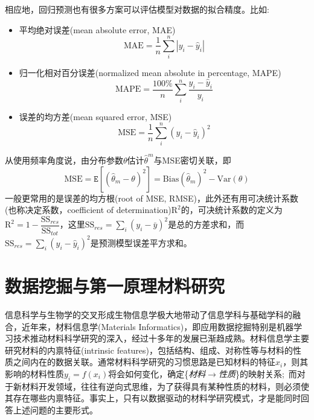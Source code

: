 相应地，回归预测也有很多方案可以评估模型对数据的拟合精度。比如:
\begin{itemize}
	\item 平均绝对误差\textrm{(mean absolute error, MAE)}
		\begin{displaymath}
			\mathrm{MAE}=\dfrac1n\sum_i^n|y_i-\hat{y}_i|
		\end{displaymath}
	\item 归一化相对百分误差\textrm{(normalized mean absolute in percentage, MAPE)}
		\begin{displaymath}
			\mathrm{MAPE}=\dfrac{100\%}n\sum_i^n\dfrac{y_i-\hat{y}_i}{y_i}
		\end{displaymath}
	\item 误差的均方差\textrm{(mean squared error, MSE)}
		\begin{displaymath}
			\mathrm{MSE}=\dfrac1n\sum_i^n(y_i-\hat{y}_i)^2
		\end{displaymath} 
\end{itemize}
从使用频率角度说，由分布参数$\theta$估计$\hat{\theta}^m$与\textrm{MSE}密切关联，即
		\begin{displaymath}
			\mathrm{MSE}=\mathtt{E}[(\hat{\theta}_m-\theta)^2]=\mathrm{Bias}(\hat{\theta}_m)^2-\mathrm{Var}(\theta)
		\end{displaymath} 
		一般更常用的是误差的均方根\textrm{(root of MSE, RMSE)}，此外还有用可决统计系数(也称决定系数，\textrm{coefficient of determination})$\mathrm{R}^2$的，可决统计系数的定义为$\mathrm{R}^2=1-\dfrac{\mathrm{SS}_{res}}{\mathrm{SS}_{tot}}$，这里$\mathrm{SS}_{res}=\sum\limits_i(y_i-\bar{y})^2$是总的方差求和，而$\mathrm{SS}_{res}=\sum\limits_i(y_i-\hat{y}_i)^2$是预测模型误差平方求和。


\section{数据挖掘与第一原理材料研究}
信息科学与生物学的交叉形成生物信息学极大地带动了信息学科与基础学科的融合，近年来，材料信息学\textrm{(Materials Informatics)}，即应用数据挖掘特别是机器学习技术推动材料科学研究的深入，经过十多年的发展已渐趋成熟\cite{MT8-38_2005}。材料信息学主要研究材料的内禀特征\textrm{(intrinsic features)}，包括结构、组成、对称性等与材料的性质之间内在的数据关联。通常材料科学研究的习惯思路是已知材料的特征$x_i$，则其影响的材料性质$y_i=f(x_i)$将会如何变化，确定\{\textit{材料}$\rightarrow$\textit{性质}\}的映射关系;~而对于新材料开发领域，往往有逆向式思维，为了获得具有某种性质的材料，则必须使其存在哪些内禀特征。事实上，只有以数据驱动的材料学研究模式，才是能同时回答上述问题的主要形式。

